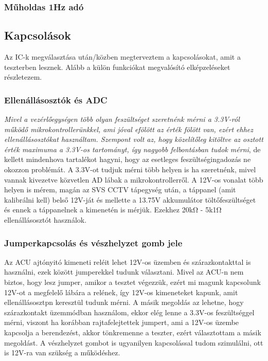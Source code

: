 \documentclass[a4paper, 12pt]{article}
\newcommand{\tab}{\hspace*{1em}}
\begin{document}
\subsubsection{Műholdas 1Hz adó}



\subsection{Kapcsolások}
Az IC-k megválasztása után/közben megterveztem a kapcsolásokat, amit a teszterben lesznek. Alább a külön funkciókat megvalósító elképzeléseket részletezem.
\subsubsection{Ellenállásosztók és ADC}
\emph{\tab Mivel a vezérlőegységen több olyan feszültséget szeretnénk mérni a 3.3V-ról működő mikrokontrollerünkkel, ami jóval efölött az érték fölött van, ezért ehhez ellenállásosztókat használtam. Szempont volt az, hogy közelítőleg kitöltve az osztott érték maximuma a 3.3V-os tartományt, így nagyobb felbontásban tudok mérni}, de kellett mindenhova tartalékot hagyni, hogy az esetleges feszültségingadozás ne okozzon problémát. A 3.3V-ot tudjuk mérni több helyen is ha szeretnénk, mivel vannak kivezetve közvetlen AD lábak a mikrokontrollerről. A 12V-os vonalat több helyen is mérem, magán az SVS CCTV tápegység után, a táppanel (amit kalibrálni kell) belső 12V-ját és mellette a 13.75V akkumulátor töltőfeszültséget és ennek a táppanelnek a kimenetén is mérjük. Ezekhez 20k\si{\ohm} - 5k1\si{\ohm} ellenállásosztót használok.


\subsubsection{Jumperkapcsolás és vészhelyzet gomb jele}
\tab Az ACU ajtónyitó kimeneti reléit lehet 12V-os üzemben és szárazkontakttal is használni, ezek között jumperekkel tudunk választani. Mivel az ACU-n nem biztos, hogy lesz jumper, amikor a tesztet végezzük, ezért mi magunk kapcsolunk 12V-ot a megfelelő lábára a relének, így 12V-os kimeneteket kapunk, amit ellenállásosztpn keresztül tudunk mérni. A másik megoldás az lehetne, hogy szárazkontakt üzemmódban használom, ekkor elég lenne a 3.3V-os feszültséggel mérni, viszont ha korábban rajtafelejtettek jumpert, ami a 12V-os üzembe kapcsolja a berendezést, akkor tönkremenne a teszter, ezért választottam a másik megoldást. A vészhelyzet gombot is ugyanilyen kapcsolással tudom szimulálni, ott is 12V-ra van szükség a működéshez.
\end{document}
